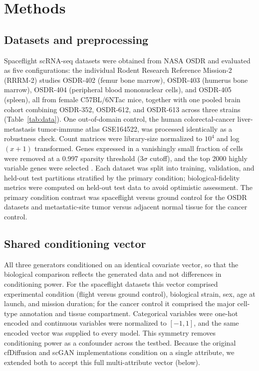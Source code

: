 \documentclass[11pt]{article}
\begin{document}
\section{Methods}

\subsection{Datasets and preprocessing}
Spaceflight scRNA-seq datasets were obtained from NASA OSDR and evaluated as five configurations: the individual Rodent Research Reference Mission-2 (RRRM-2) studies OSDR-402 (femur bone marrow), OSDR-403 (humerus bone marrow), OSDR-404 (peripheral blood mononuclear cells), and OSDR-405 (spleen), all from female C57BL/6NTac mice, together with one pooled brain cohort combining OSDR-352, OSDR-612, and OSDR-613 across three strains (Table~\ref{tab:data}). One out-of-domain control, the human colorectal-cancer liver-metastasis tumor-immune atlas GSE164522, was processed identically as a robustness check. Count matrices were library-size normalized to $10^4$ and log$(x+1)$ transformed. Genes expressed in a vanishingly small fraction of cells were removed at a 0.997 sparsity threshold ($3\sigma$ cutoff), and the top 2000 highly variable genes were selected \cite{seurat}. Each dataset was split into training, validation, and held-out test partitions stratified by the primary condition; biological-fidelity metrics were computed on held-out test data to avoid optimistic assessment. The primary condition contrast was spaceflight versus ground control for the OSDR datasets and metastatic-site tumor versus adjacent normal tissue for the cancer control.

\subsection{Shared conditioning vector}
All three generators conditioned on an identical covariate vector, so that the biological comparison reflects the generated data and not differences in conditioning power. For the spaceflight datasets this vector comprised experimental condition (flight versus ground control), biological strain, sex, age at launch, and mission duration; for the cancer control it comprised the major cell-type annotation and tissue compartment. Categorical variables were one-hot encoded and continuous variables were normalized to $[-1,1]$, and the same encoded vector was supplied to every model. This symmetry removes conditioning power as a confounder across the testbed. Because the original cfDiffusion and scGAN implementations condition on a single attribute, we extended both to accept this full multi-attribute vector (below).
\end{document}

